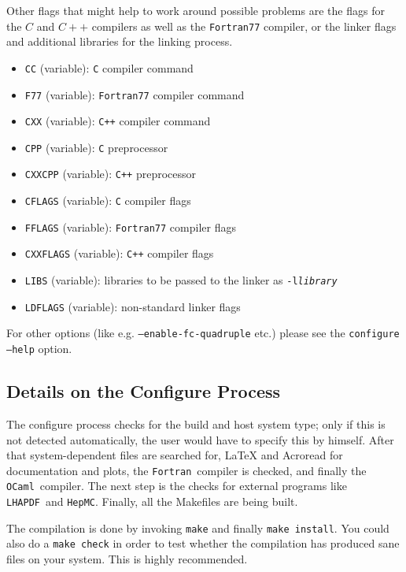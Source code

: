 \documentclass[12pt]{book}
\newcommand{\ttt}[1]{\texttt{#1}}
\newcommand{\lhapdf}{\texttt{LHAPDF}}
\newcommand{\fortran}{\texttt{Fortran}}
\newcommand{\ocaml}{\texttt{OCaml}}
\begin{document}
Other flags that might help to work around possible problems are the
flags for the $C$ and $C++$ compilers as well as the \ttt{Fortran77}
compiler, or the linker flags and additional libraries for the linking
process. 
\begin{itemize}
\item 
  \ttt{CC} (variable): \ttt{C} compiler command
\item
  \ttt{F77} (variable): \ttt{Fortran77} compiler command
\item
  \ttt{CXX} (variable): \ttt{C++} compiler command
\item
  \ttt{CPP} (variable): \ttt{C} preprocessor
\item
  \ttt{CXXCPP} (variable): \ttt{C++} preprocessor
\item
  \ttt{CFLAGS} (variable): \ttt{C} compiler flags
\item
  \ttt{FFLAGS} (variable): \ttt{Fortran77} compiler flags
\item
  \ttt{CXXFLAGS} (variable): \ttt{C++} compiler flags
\item
  \ttt{LIBS} (variable): libraries to be passed to the linker as
  \ttt{-l{\em library}}
\item
  \ttt{LDFLAGS} (variable): non-standard linker flags
\end{itemize}

For other options (like e.g. \ttt{--enable-fc-quadruple} etc.) please
see the \ttt{configure --help} option.


\subsection{Details on the Configure Process}

The configure process checks for the build and host system type; only
if this is not detected automatically, the user would have to specify
this by himself. After that system-dependent files are searched for,
LaTeX and Acroread for documentation and plots, the \fortran\ compiler 
is checked, and finally the \ocaml\ compiler. The next step is the
checks for external programs like \lhapdf\ and \texttt{HepMC}.
Finally, all the Makefiles are being built. 

The compilation is done by invoking \texttt{make} and finally
\texttt{make install}. You could also do a \texttt{make check} in
order to test whether the compilation has produced sane files on your
system. This is highly recommended.
\end{document}
